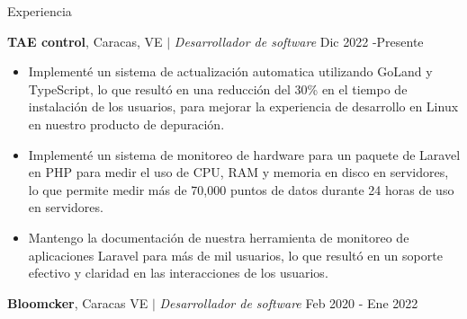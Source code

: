 \documentclass{resume} %
\begin{document}
\begin{rSection}{Experiencia} %

\textbf{TAE control}, Caracas, VE $\mid$ \textit{Desarrollador de software} \hfill Dic 2022 -Presente\\

\begin{itemize}
    \item Implementé un sistema de actualización automatica utilizando GoLand y TypeScript, lo que resultó en una reducción del 30\% en el tiempo de instalación de los usuarios, para mejorar la experiencia de desarrollo en Linux en nuestro producto de depuración.
    
    \item Implementé un sistema de monitoreo de hardware para un paquete de Laravel en PHP para medir el uso de CPU, RAM y memoria en disco en servidores, lo que permite medir más de 70,000 puntos de datos durante 24 horas de uso en servidores.
    
    \item Mantengo la documentación de nuestra herramienta de monitoreo de aplicaciones Laravel para más de mil usuarios, lo que resultó en un soporte efectivo y claridad en las interacciones de los usuarios.
\end{itemize}


    

\textbf{Bloomcker}, Caracas VE $\mid$ \textit{Desarrollador de software} \hfill Feb 2020 - Ene 2022


\end{rSection}
\end{document}
